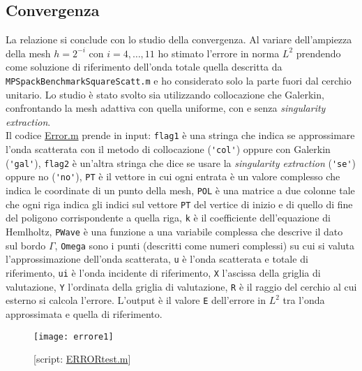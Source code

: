 \subsection{Convergenza}
La relazione si conclude con lo studio della convergenza. Al variare dell'ampiezza della mesh $h=2^{-i}$ con $i=4,\dots,11$ ho stimato l'errore in norma $L^2$ prendendo come soluzione di riferimento dell'onda totale quella descritta da \verb|MPSpackBenchmarkSquareScatt.m| e ho considerato solo la parte fuori dal cerchio unitario. Lo studio è stato svolto sia utilizzando collocazione che Galerkin, confrontando la mesh adattiva con quella uniforme, con e senza \textit{singularity extraction}.\\
Il codice \href{https://github.com/Daldossi/BEM/blob/main/Error.m}{Error.m} prende in input: \verb|flag1| è una stringa che indica se approssimare l'onda scatterata con il metodo di collocazione (\verb|'col'|) oppure con Galerkin (\verb|'gal'|), \verb|flag2| è un'altra stringa che dice se usare la \textit{singularity extraction} (\verb|'se'|) oppure no (\verb|'no'|), \verb|PT| è il vettore in cui ogni entrata è un valore complesso che indica le coordinate di un punto della mesh, \verb|POL| è una matrice a due colonne tale che ogni riga indica gli indici sul vettore \verb|PT| del vertice di inizio e di quello di fine del poligono corrispondente a quella riga, \verb|k| è il coefficiente dell'equazione di Hemlholtz, \verb|PWave| è una funzione a una variabile complessa che descrive il dato sul bordo $\Gamma$, \verb|Omega| sono i punti (descritti come numeri complessi) su cui si valuta l'approssimazione dell'onda scatterata, \verb|u| è l'onda scatterata e totale di riferimento, \verb|ui| è l'onda incidente di riferimento, \verb|X| l'ascissa della griglia di valutazione, \verb|Y| l'ordinata della griglia di valutazione, \verb|R| è il raggio del cerchio al cui esterno si calcola l'errore. L'output è il valore \verb|E| dell'errore in $L^2$ tra l'onda approssimata e quella di riferimento. 

\begin{figure}[h]
	\centering
	\texttt{[image: errore1]}
	\caption{[script: \href{https://github.com/Daldossi/BEM/blob/main/Error_test.m}{ERRORtest.m}] }
	\label{fig_errore}
\end{figure}